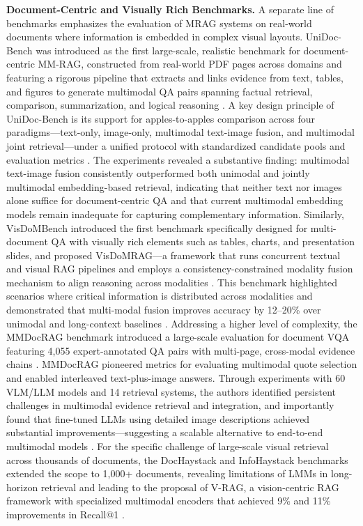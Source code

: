 \documentclass[11pt]{article}
\begin{document}
\textbf{Document-Centric and Visually Rich Benchmarks.} A separate line of benchmarks emphasizes the evaluation of MRAG systems on real-world documents where information is embedded in complex visual layouts. UniDoc-Bench was introduced as the first large-scale, realistic benchmark for document-centric MM-RAG, constructed from real-world PDF pages across domains and featuring a rigorous pipeline that extracts and links evidence from text, tables, and figures to generate multimodal QA pairs spanning factual retrieval, comparison, summarization, and logical reasoning \cite{ref358}. A key design principle of UniDoc-Bench is its support for apples-to-apples comparison across four paradigms---text-only, image-only, multimodal text-image fusion, and multimodal joint retrieval---under a unified protocol with standardized candidate pools and evaluation metrics \cite{ref358}. The experiments revealed a substantive finding: multimodal text-image fusion consistently outperformed both unimodal and jointly multimodal embedding-based retrieval, indicating that neither text nor images alone suffice for document-centric QA and that current multimodal embedding models remain inadequate for capturing complementary information. Similarly, VisDoMBench introduced the first benchmark specifically designed for multi-document QA with visually rich elements such as tables, charts, and presentation slides, and proposed VisDoMRAG---a framework that runs concurrent textual and visual RAG pipelines and employs a consistency-constrained modality fusion mechanism to align reasoning across modalities \cite{ref359}. This benchmark highlighted scenarios where critical information is distributed across modalities and demonstrated that multi-modal fusion improves accuracy by 12--20\% over unimodal and long-context baselines \cite{ref359}. Addressing a higher level of complexity, the MMDocRAG benchmark introduced a large-scale evaluation for document VQA featuring 4,055 expert-annotated QA pairs with multi-page, cross-modal evidence chains \cite{ref360}. MMDocRAG pioneered metrics for evaluating multimodal quote selection and enabled interleaved text-plus-image answers. Through experiments with 60 VLM/LLM models and 14 retrieval systems, the authors identified persistent challenges in multimodal evidence retrieval and integration, and importantly found that fine-tuned LLMs using detailed image descriptions achieved substantial improvements---suggesting a scalable alternative to end-to-end multimodal models \cite{ref360}. For the specific challenge of large-scale visual retrieval across thousands of documents, the DocHaystack and InfoHaystack benchmarks extended the scope to 1,000+ documents, revealing limitations of LMMs in long-horizon retrieval and leading to the proposal of V-RAG, a vision-centric RAG framework with specialized multimodal encoders that achieved 9\% and 11\% improvements in Recall@1 \cite{ref345}.
\end{document}
